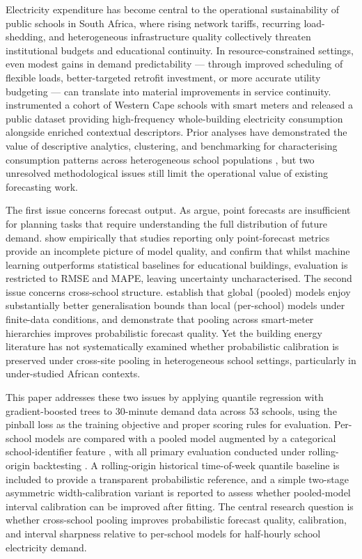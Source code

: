 \documentclass[12pt,a4paper]{article}
\begin{document}
Electricity expenditure has become central to the operational sustainability of public schools in South Africa, where rising network tariffs, recurring load-shedding, and heterogeneous infrastructure quality collectively threaten institutional budgets and educational continuity. In resource-constrained settings, even modest gains in demand predictability --- through improved scheduling of flexible loads, better-targeted retrofit investment, or more accurate utility budgeting --- can translate into material improvements in service continuity. \citet{samuels2025dataset} instrumented a cohort of Western Cape schools with smart meters and released a public dataset providing high-frequency whole-building electricity consumption alongside enriched contextual descriptors. Prior analyses have demonstrated the value of descriptive analytics, clustering, and benchmarking for characterising consumption patterns across heterogeneous school populations \citep{samuels2020, michaelahile2024}, but two unresolved methodological issues still limit the operational value of existing forecasting work.

The first issue concerns forecast output. As \citet{hongfan2016} argue, point forecasts are insufficient for planning tasks that require understanding the full distribution of future demand. \citet{haben2021} show empirically that studies reporting only point-forecast metrics provide an incomplete picture of model quality, and \citet{elhabyb2024} confirm that whilst machine learning outperforms statistical baselines for educational buildings, evaluation is restricted to RMSE and MAPE, leaving uncertainty uncharacterised. The second issue concerns cross-school structure. \citet{montero2021} establish that global (pooled) models enjoy substantially better generalisation bounds than local (per-school) models under finite-data conditions, and \citet{bentaieb2021} demonstrate that pooling across smart-meter hierarchies improves probabilistic forecast quality. Yet the building energy literature has not systematically examined whether probabilistic calibration is preserved under cross-site pooling in heterogeneous school settings, particularly in under-studied African contexts.

This paper addresses these two issues by applying quantile regression with gradient-boosted trees \citep{friedman2001, ke2017} to 30-minute demand data across 53 schools, using the pinball loss \citep{koenker1978} as the training objective and proper scoring rules \citep{gneitingraftery2007} for evaluation. Per-school models are compared with a pooled model augmented by a categorical school-identifier feature \citep{montero2021}, with all primary evaluation conducted under rolling-origin backtesting \citep{hyndman2021}. A rolling-origin historical time-of-week quantile baseline is included to provide a transparent probabilistic reference, and a simple two-stage asymmetric width-calibration variant is reported to assess whether pooled-model interval calibration can be improved after fitting. The central research question is whether cross-school pooling improves probabilistic forecast quality, calibration, and interval sharpness relative to per-school models for half-hourly school electricity demand.
\end{document}
